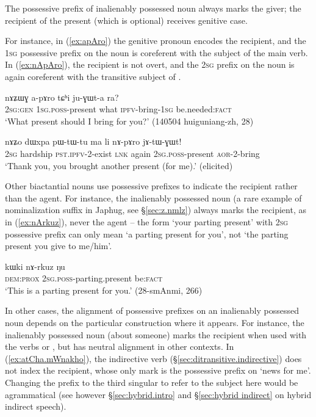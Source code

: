 The possessive prefix of inalienably possessed noun  always marks the giver; the recipient of the present (which is optional) receives genitive case. 

For instance, in (\ref{ex:apAro}) the genitive pronoun  encodes the recipient, and the \textsc{1sg} possessive prefix on the noun is coreferent with the subject of the main verb. In (\ref{ex:nApAro}), the recipient is not overt, and the \textsc{2sg} prefix on the noun is again coreferent with the transitive subject of .

\begin{exe}
\ex \label{ex:apAro}
\gll nɤʑɯɣ a-pɤro tɕʰi ju-ɣɯt-a ra? \\
\textsc{2sg}:\textsc{gen} \textsc{1sg}.\textsc{poss}-present what \textsc{ipfv}-bring-\textsc{1sg} be.needed:\textsc{fact} \\
\glt `What present should I bring for you?' (140504 huiguniang-zh, 28)
\end{exe}

\begin{exe}
\ex \label{ex:nApAro}
\gll nɤʑo dɯxpa pɯ-tɯ-tu ma li nɤ-pɤro jɤ-tɯ-ɣɯt! \\
\textsc{2sg} hardship \textsc{pst}.\textsc{ipfv}-2-exist \textsc{lnk} again \textsc{2sg}.\textsc{poss}-present \textsc{aor}-2-bring \\
\glt `Thank you, you brought another present (for me).' (elicited)
\end{exe}

Other biactantial nouns use possessive prefixes to indicate the recipient rather than the agent. For instance, the inalienably possessed noun  (a rare example of  nominalization suffix in Japhug, see §\ref{sec:z.nmlz}) always marks the recipient, as in (\ref{ex:nArkuz}), never the agent -- the form  `your parting present' with \textsc{2sg} possessive prefix can only mean `a parting present for you', not `the parting present you give to me/him'.

\begin{exe}
\ex \label{ex:nArkuz}
\gll  kɯki nɤ-rkuz ŋu \\
\textsc{dem}:\textsc{prox} \textsc{2sg}.\textsc{poss}-parting.present be:\textsc{fact} \\
\glt `This is a parting present for you.' (28-smAnmi, 266)
\end{exe}

In other cases, the alignment of possessive prefixes on an inalienably possessed noun depends on the  particular construction where it appears. For instance, the inalienably possessed noun  (about someone) marks the recipient when used with the verbs  or , but has neutral alignment in other contexts. In (\ref{ex:atCha.mWnakho}), the indirective verb  (§\ref{sec:ditransitive.indirective}) does not index the recipient, whose only mark is the possessive prefix on  `news for me'. Changing the prefix to the third singular  to refer to the subject here would be agrammatical (see however §\ref{sec:hybrid.intro} and §\ref{sec:hybrid indirect} on hybrid indirect speech).


